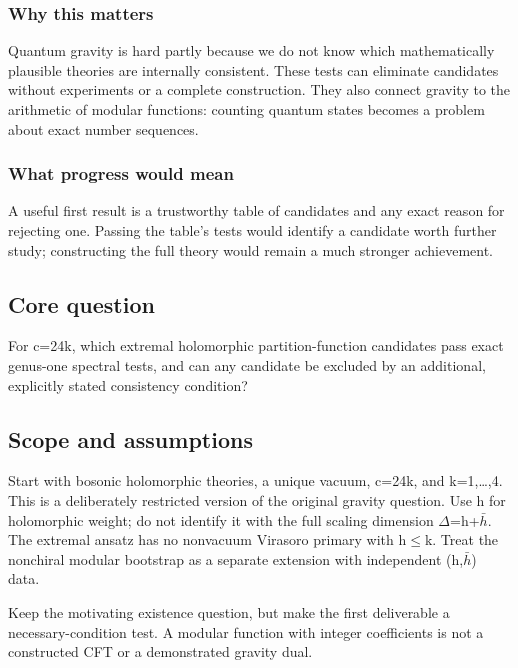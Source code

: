 \documentclass[
  11pt,
]{article}
\begin{document}
\subsubsection{Why this matters}

Quantum gravity is hard partly because we do not know which
mathematically plausible theories are internally consistent. These tests
can eliminate candidates without experiments or a complete construction.
They also connect gravity to the arithmetic of modular functions:
counting quantum states becomes a problem about exact number sequences.

\subsubsection{What progress would mean}

A useful first result is a trustworthy table of candidates and any exact
reason for rejecting one. Passing the table's tests would identify a
candidate worth further study; constructing the full theory would remain
a much stronger achievement.

\subsection{Core question}

For c=24k, which extremal holomorphic partition-function candidates pass
exact genus-one spectral tests, and can any candidate be excluded by an
additional, explicitly stated consistency condition?

\subsection{Scope and assumptions}

Start with bosonic holomorphic theories, a unique vacuum, c=24k, and
k=1,\ldots,4. This is a deliberately restricted version of the original
gravity question. Use h for holomorphic weight; do not identify it with
the full scaling dimension \ensuremath{\Delta}=h+\ensuremath{\bar{h}}.
The extremal ansatz has no nonvacuum Virasoro primary with
h\ensuremath{\le}k. Treat the nonchiral modular bootstrap as a separate
extension with independent (h,\ensuremath{\bar{h}}) data.

Keep the motivating existence question, but make the first deliverable a
necessary-condition test. A modular function with integer coefficients
is not a constructed CFT or a demonstrated gravity dual.
\end{document}
